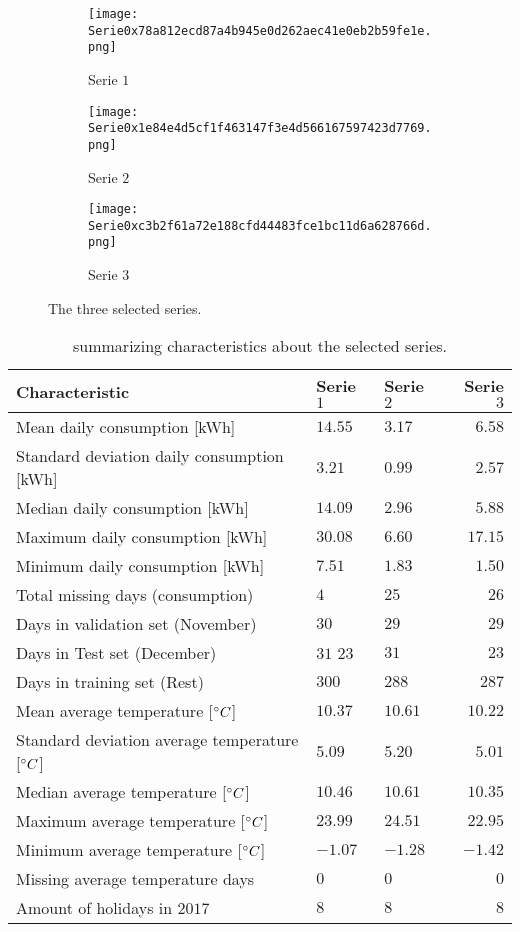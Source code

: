 \begin{figure}[ht]
	\begin{subfigure}{0.32\textwidth}
		\texttt{[image: Serie0x78a812ecd87a4b945e0d262aec41e0eb2b59fe1e.png]}
		\caption{Serie $ 1 $}
	\end{subfigure}	 	
	\begin{subfigure}{0.32\textwidth}
		\texttt{[image: Serie0x1e84e4d5cf1f463147f3e4d566167597423d7769.png]}
		\caption{Serie $ 2 $}
	\end{subfigure}	
	\begin{subfigure}{0.32\textwidth}
		\texttt{[image: Serie0xc3b2f61a72e188cfd44483fce1bc11d6a628766d.png]}
		\caption{Serie $ 3 $}
	\end{subfigure}
	\caption{The three selected series. }
\end{figure}

\begin{table}
  \centering
  \begin{tabular}{@{}l|llr@{}} \toprule
  	\textbf{Characteristic}	& \textbf{Serie $ 1 $} & \textbf{Serie $ 2 $} & \textbf{Serie $ 3 $}\\\midrule
    Mean daily consumption [kWh]& $ 14.55 $&$ 3.17 $  & $ 6.58 $ \\
    Standard deviation daily consumption [kWh] &$ 3.21 $ & $ 0.99 $& $ 2.57 $ \\
    Median daily consumption [kWh] & $ 14.09 $ & $ 2.96 $& $ 5.88 $ \\
    Maximum daily consumption [kWh] & $ 30.08 $ & $ 6.60 $ &  $ 17.15 $   \\
    Minimum daily consumption [kWh]& $ 7.51 $ & $ 1.83 $ &  $ 1.50 $   \\
    Total missing days (consumption) & $ 4 $ &$ 25 $ & $ 26 $\\
    Days in validation set (November)&  $ 30 $ & $ 29 $  & $ 29 $ \\
    Days in Test set (December) & $ 31 $  $ 23 $  &    $ 31 $  & $ 23 $ \\
    Days in training set (Rest)&   $ 300 $  &  $ 288 $   &  $ 287 $\\
    Mean average temperature [$\degree C$]& $ 10.37 $  &  $ 10.61 $  & $ 10.22 $ \\
    Standard deviation average temperature [$\degree C$]& $ 5.09 $  & $ 5.20 $   & $ 5.01 $ \\
    Median average temperature [$\degree C$] &  $ 10.46 $ &  $ 10.61 $  & $ 10.35 $ \\
    Maximum average temperature [$\degree C$] & $ 23.99 $  & $ 24.51 $   & $ 22.95 $ \\ 
    Minimum average temperature [$\degree C$] & $ -1.07 $  &  $ -1.28 $  & $ -1.42 $ \\
    Missing average temperature days &  $ 0 $ & $ 0 $  & $ 0 $  \\ 
    Amount of holidays in $ 2017 $ & $ 8 $  &  $ 8 $  & $ 8 $ \\
  \end{tabular}
  \caption{summarizing characteristics about the selected series.}
  \label{tab:ok}
\end{table}

